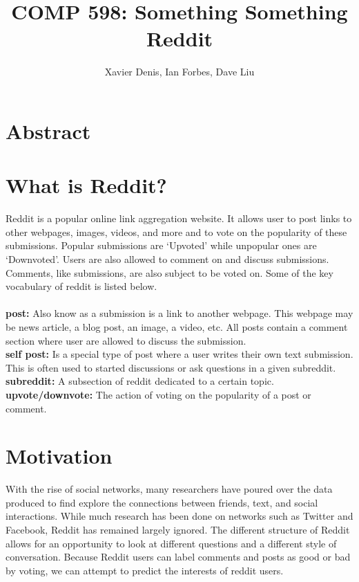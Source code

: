 \documentclass[11pt,twocolumn]{article}
\title {COMP 598: Something Something Reddit}
\author {Xavier Denis, Ian Forbes, Dave Liu}
\begin{document}
\maketitle

\section{Abstract}

\section{What is Reddit?}

Reddit is a popular online link aggregation website. It allows user to post links to other webpages, images, videos, and more and to vote on the popularity of these submissions. Popular submissions are `Upvoted' while unpopular ones are `Downvoted'. Users are also allowed to comment on and discuss submissions. Comments, like submissions, are also subject to be voted on. Some of the key vocabulary of reddit is listed below.
\\
\\
\textbf{post:} Also know as a submission is a link to another webpage. This webpage may be news article, a blog post, an image, a video, etc. All posts contain a comment section where user are allowed to discuss the submission.
\\
\textbf{self post:} Is a special type of post where a user writes their own text submission. This is often used to started discussions or ask questions in a given subreddit. 
\\
\textbf{subreddit:} A subsection of reddit dedicated to a certain topic. 
\\
\textbf{upvote/downvote:} The action of voting on the popularity of a post or comment.

\section{Motivation}
With the rise of social networks, many researchers have poured over the data produced to find explore the connections between friends, text, and social interactions. While much research has been done on networks such as Twitter and Facebook, Reddit has remained largely ignored. The different structure of Reddit allows for an opportunity to look at different questions and a different style of conversation. Because Reddit users can label comments and posts as good or bad by voting, we can attempt to predict the interests of reddit users. 
\end{document}
